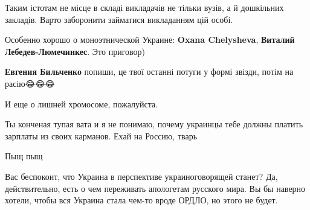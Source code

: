 

Таким істотам не місце в складі викладачів не тільки вузів, а й дошкільних закладів.
Варто заборонити займатися викладанням цій особі.




Особенно хорошо о моноэтнической Украине: \textbf{Oxana Chelysheva},
\textbf{Виталий Лебедев-Люмечинкес}. Это приговор)

\begin{itemize}

\textbf{Евгения Бильченко} попиши, це твої останні потуги у формі звізди, потім на расію😂😂😂
\end{itemize}


И еще о лишней хромосоме, пожалуйста.


\begin{itemize}

Ты конченая тупая вата и я не понимаю, почему украинцы тебе должны платить зарплаты из своих карманов. Ехай на Россию, тварь


Пыщ пыщ
\end{itemize}



Вас беспокоит, что Украина в перспективе украиноговорящей станет? Да,
действительно, есть о чем переживать апологетам русского мира. Вы бы наверно
хотели, чтобы вся Украина стала чем-то вроде ОРДЛО, но этого не будет. 

